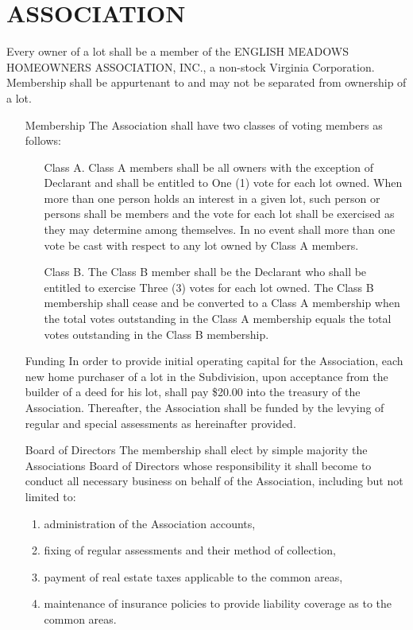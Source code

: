 \documentclass[12pt, letterpaper]{article}
\begin{document}
\section{ASSOCIATION}
Every owner of a lot shall be a member of the ENGLISH MEADOWS HOMEOWNERS ASSOCIATION, INC., a non-stock Virginia Corporation.
Membership shall be appurtenant to and may not be separated from ownership of a lot.
\begin{enumerate}
 \item[Membership] The Association shall have two classes of voting members as follows:
 \begin{itemize}
  \item[Class A.] Class A members shall be all owners with the exception of Declarant and shall be entitled to One (1) vote for each lot owned.
   When more than one person holds an interest in a given lot, such person or persons shall be members and the vote for each lot shall be exercised as they may determine among themselves.
   In no event shall more than one vote be cast with respect to any lot owned by Class A members.
  \item[Class B.] The Class B member shall be the Declarant who shall be entitled to exercise Three (3) votes for each lot owned.
   The Class B membership shall cease and be converted to a Class A membership when the total votes outstanding in the Class A membership equals the total votes outstanding in the Class B membership.
 \end{itemize}
 \item[Funding] In order to provide initial operating capital for the Association, each new home purchaser of a lot in the Subdivision, upon acceptance from the builder of a deed for his lot, shall pay \$20.00 into the treasury of the Association.
  Thereafter, the Association shall be funded by the levying of regular and special assessments as hereinafter provided.
 \item[Board of Directors] The membership shall elect by simple majority the Associations Board of Directors whose responsibility it shall become to conduct all necessary business on behalf of the Association, including but not limited to:
 \begin{enumerate}
  \item administration of the Association accounts,
  \item fixing of regular assessments and their method of collection,
  \item payment of real estate taxes applicable to the common areas,
  \item maintenance of insurance policies to provide liability coverage as to the common areas.
 \end{enumerate}
\end{enumerate}
\end{document}
